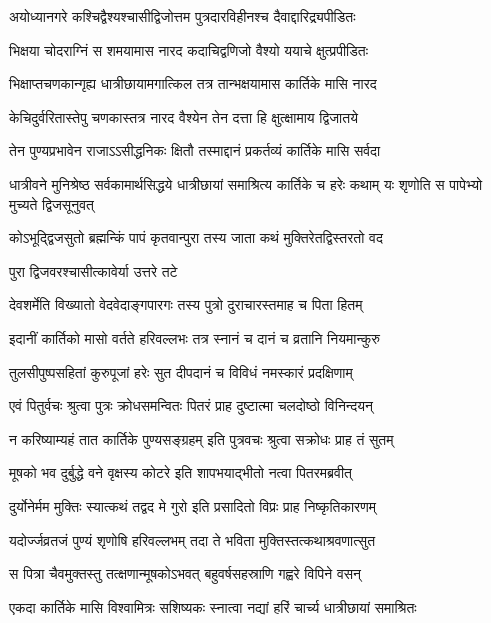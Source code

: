\twolineshloka
{अयोध्यानगरे कश्चिद्वैश्यश्चासीद्विजोत्तम}
{पुत्रदारविहीनश्च दैवाद्दारिद्र्यपीडितः} %

\twolineshloka
{भिक्षया चोदराग्निं स शमयामास नारद}
{कदाचिद्वणिजो वैश्यो ययाचे क्षुत्प्रपीडितः} %

\twolineshloka
{भिक्षाप्तचणकान्गृह्य धात्रीछायामगात्किल}
{तत्र तान्भक्षयामास कार्तिके मासि नारद} %

\twolineshloka
{केचिदुर्वरितास्तेपु चणकास्तत्र नारद}
{वैश्येन तेन दत्ता हि क्षुत्क्षामाय द्विजातये} %

\twolineshloka
{तेन पुण्यप्रभावेन राजाऽऽसीद्धनिकः क्षितौ}
{तस्माद्दानं प्रकर्तव्यं कार्तिके मासि सर्वदा} %

\threelineshloka
{धात्रीवने मुनिश्रेष्ठ सर्वकामार्थसिद्धये}
{धात्रीछायां समाश्रित्य कार्तिके च हरेः कथाम्}
{यः शृणोति स पापेभ्यो मुच्यते द्विजसूनुवत्} %

\twolineshloka
{कोऽभूद्द्विजसुतो ब्रह्मन्किं पापं कृतवान्पुरा}
{तस्य जाता कथं मुक्तिरेतद्विस्तरतो वद} %



\onelineshloka
{पुरा द्विजवरश्चासीत्कावेर्या उत्तरे तटे} %

\twolineshloka
{देवशर्मेति विख्यातो वेदवेदाङ्गपारगः}
{तस्य पुत्रो दुराचारस्तमाह च पिता हितम्} %

\twolineshloka
{इदानीं कार्तिको मासो वर्तते हरिवल्लभः}
{तत्र स्नानं च दानं च व्रतानि नियमान्कुरु} %

\twolineshloka
{तुलसीपुष्पसहितां कुरुपूजां हरेः सुत}
{दीपदानं च विविधं नमस्कारं प्रदक्षिणाम्} %

\twolineshloka
{एवं पितुर्वचः श्रुत्वा पुत्रः क्रोधसमन्वितः}
{पितरं प्राह दुष्टात्मा चलदोष्ठो विनिन्दयन्} %


\twolineshloka
{न करिष्याम्यहं तात कार्तिके पुण्यसङ्ग्रहम्}
{इति पुत्रवचः श्रुत्वा सक्रोधः प्राह तं सुतम्} %

\twolineshloka
{मूषको भव दुर्बुद्धे वने वृक्षस्य कोटरे}
{इति शापभयाद्भीतो नत्वा पितरमब्रवीत्} %

\twolineshloka
{दुर्योनेर्मम मुक्तिः स्यात्कथं तद्वद मे गुरो}
{इति प्रसादितो विप्रः प्राह निष्कृतिकारणम्} %

\twolineshloka
{यदोर्ज्जव्रतजं पुण्यं शृणोषि हरिवल्लभम्}
{तदा ते भविता मुक्तिस्तत्कथाश्रवणात्सुत} %

\twolineshloka
{स पित्रा चैवमुक्तस्तु तत्क्षणान्मूषकोऽभवत्}
{बहुवर्षसहस्राणि गह्वरे विपिने वसन्} %

\twolineshloka
{एकदा कार्तिके मासि विश्वामित्रः सशिष्यकः}
{स्नात्वा नद्यां हरिं चार्च्य धात्रीछायां समाश्रितः} %

